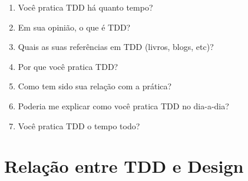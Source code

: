 \begin{enumerate}
	\item Você pratica TDD há quanto tempo?

	\item Em sua opinião, o que é TDD?
	
	\item Quais as suas referências em TDD (livros, blogs, etc)?

	\item Por que você pratica TDD?

	\item Como tem sido sua relação com a prática?

	\item Poderia me explicar como você pratica TDD no dia-a-dia?

	\item Você pratica TDD o tempo todo?
\end{enumerate}

\section{Relação entre TDD e Design}

